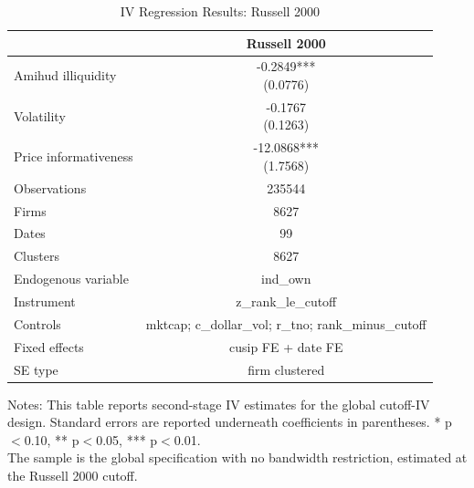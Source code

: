 \begin{table}[!htbp]\centering
\caption{IV Regression Results: Russell 2000}
\label{tab:iv_global_results_r2000}
\begin{threeparttable}
\footnotesize
\setlength{\tabcolsep}{3.5pt}
\renewcommand{\arraystretch}{1.05}
\begin{tabular}{lc}
\toprule
 & Russell 2000 \\
\midrule
Amihud illiquidity & \shortstack{-0.2849***\\(0.0776)} \\
Volatility & \shortstack{-0.1767\\(0.1263)} \\
Price informativeness & \shortstack{-12.0868***\\(1.7568)} \\
\midrule
Observations & 235544 \\
Firms & 8627 \\
Dates & 99 \\
Clusters & 8627 \\
Endogenous variable & ind_own \\
Instrument & z_rank_le_cutoff \\
Controls & mktcap; c_dollar_vol; r_tno; rank_minus_cutoff \\
Fixed effects & cusip FE + date FE \\
SE type & firm clustered \\
\bottomrule
\end{tabular}
\vspace{0.35em}
\noindent\parbox{\textwidth}{\footnotesize
Notes: This table reports second-stage IV estimates for the global cutoff-IV design. Standard errors are reported underneath coefficients in parentheses. * p$<$0.10, ** p$<$0.05, *** p$<$0.01.\\
The sample is the global specification with no bandwidth restriction, estimated at the Russell 2000 cutoff.
}
\end{threeparttable}
\end{table}
